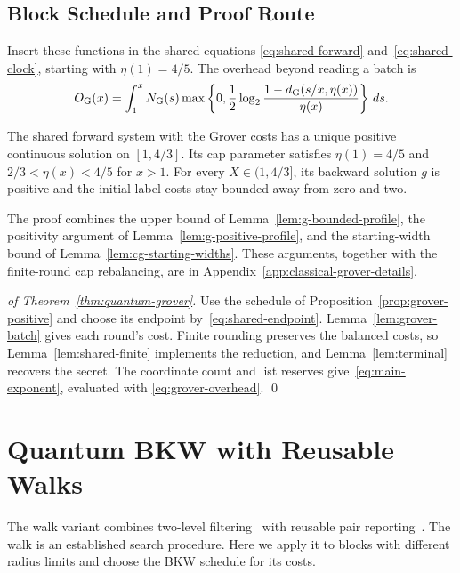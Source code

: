 \documentclass[runningheads,envcountsame,envcountsect,orivec]{llncs}
\begin{document}
\subsection{Block Schedule and Proof Route}
\label{sec:grover-continuation}

Insert these functions in the shared equations
\eqref{eq:shared-forward} and~\eqref{eq:shared-clock}, starting with
$\eta(1)=4/5$. The overhead beyond reading a batch is
\begin{align}
 O_{\rm G}(x)
  =\int_1^x N_{\rm G}(s)
     \max\left\{0,\frac12\log_2
       \frac{1-d_{\rm G}(s/x,\eta(x))}{\eta(x)}\right\}\,ds .
 \label{eq:grover-overhead}
\end{align}


\begin{proposition}
\label{prop:grover-positive}
The shared forward system with the Grover costs has a unique
positive continuous solution on $[1,4/3]$. Its cap parameter
satisfies $\eta(1)=4/5$ and $2/3<\eta(x)<4/5$ for $x>1$.
For every $X\in(1,4/3]$, its backward solution $g$ is positive
and the initial label costs stay bounded away from zero and two.
\end{proposition}


The proof combines the upper bound of
Lemma~\ref{lem:g-bounded-profile}, the positivity argument of
Lemma~\ref{lem:g-positive-profile}, and the starting-width bound of
Lemma~\ref{lem:cg-starting-widths}. These arguments, together with
the finite-round cap rebalancing, are in
Appendix~\ref{app:classical-grover-details}.

\begin{proof}[of Theorem~\ref{thm:quantum-grover}]
Use the schedule of Proposition~\ref{prop:grover-positive} and choose
its endpoint by~\eqref{eq:shared-endpoint}.
Lemma~\ref{lem:grover-batch} gives each round's cost.
Finite rounding preserves the balanced costs, so
Lemma~\ref{lem:shared-finite} implements the reduction, and
Lemma~\ref{lem:terminal} recovers the secret. The coordinate count
and list reserves give~\eqref{eq:main-exponent}, evaluated with
\eqref{eq:grover-overhead}.
\qed
\end{proof}

\section{Quantum BKW with Reusable Walks}
\label{sec:quantum}
\label{sec:quantum-walks}

The walk variant combines two-level filtering~\cite{CL21}
with reusable pair reporting~\cite{BCSS23,BLSS25}. The walk is an
established search procedure. Here we apply it to blocks with different
radius limits and choose the BKW schedule for its costs.
\end{document}
